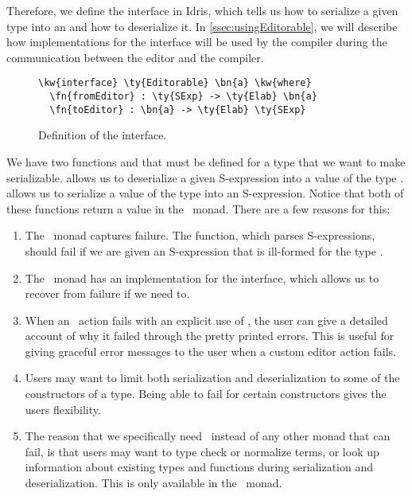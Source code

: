 Therefore, we define the interface  in Idris, which tells us
how to serialize a given type into an  and how to deserialize it.
In \autoref{ssec:usingEditorable}, we will describe how implementations for
the  interface will be used by the compiler during the
communication between the editor and the compiler.

\begin{figure}[H]
\caption{Definition of the  interface.}
\label{code:editorable}
\begin{Verbatim}[framesep=2mm, label=\footnotesize{\normalfont{Idris}}, labelposition=topline]
\kw{interface} \ty{Editorable} \bn{a} \kw{where}
  \fn{fromEditor} : \ty{SExp} -> \ty{Elab} \bn{a}
  \fn{toEditor} : \bn{a} -> \ty{Elab} \ty{SExp}
\end{Verbatim}
\end{figure}

We have two functions  and  that must be defined
for a type that we want to make serializable.
 allows us to deserialize a given S-expression into a value of the type .
 allows us to serialize a value of the type  into an S-expression.
Notice that both of these functions return a value in the \Elab\ monad.
There are a few reasons for this:
\begin{enumerate}
  \item The \Elab\ monad captures failure. The 
    function, which parses S-expressions, should fail if we are
    given an S-expression that is ill-formed for the type .
  \item The \Elab\ monad has an implementation for the 
    interface, which allows us to recover from failure if we need to.
  \item When an \Elab\ action fails with an explicit use of
    ,
    the user can give a detailed account of why it failed through the pretty
    printed errors. This is useful for giving graceful error messages to the
    user when a custom editor action fails.
  \item Users may want to limit both serialization and deserialization
    to some of the constructors of a type. Being able to fail for certain
    constructors gives the users flexibility.
  \item The reason that we specifically need \Elab\ instead of any other monad that can
    fail, is that users may want to type check or normalize terms, or look up
    information about existing types and functions during serialization and
    deserialization. This is only available in the \Elab\ monad.
\end{enumerate}

